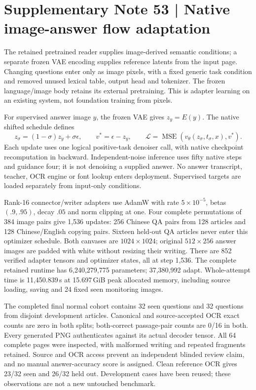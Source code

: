 \clearpage
\section*{Supplementary Note 53 | Native image-answer flow adaptation}
\label{note:native-visual-flow}
The retained pretrained reader supplies image-derived semantic conditions;
a separate frozen VAE encoding supplies reference latents from the input page.
Changing questions enter only as image pixels, with a fixed generic task
condition and removed unused lexical table, output head and tokenizer.
The frozen language/image body retains its external pretraining. This is
adapter learning on an existing system, not foundation training from pixels.

For supervised answer image $y$, the frozen VAE gives $z_y=E(y)$.
The native shifted schedule defines
\[
z_\sigma=(1-\sigma)z_y+\sigma\epsilon,\qquad
v^*=\epsilon-z_y,\qquad
\mathcal L=\operatorname{MSE}(v_\theta(z_\sigma,t_\sigma,x),v^*).
\]
Each update uses one logical positive-task denoiser call, with native
checkpoint recomputation in backward. Independent-noise inference uses
fifty native steps and guidance four; it is not denoising a supplied answer.
No answer transcript, teacher, OCR engine or font lookup enters deployment.
Supervised targets are loaded separately from input-only conditions.

Rank-16 connector/writer adapters use AdamW with rate $5\times10^{-5}$,
betas $(.9,.95)$, decay $.05$ and norm clipping at one. Four complete
permutations of 384 image pairs give 1,536 updates: 256 Chinese QA pairs from 128
articles and 128 Chinese/English copying pairs. Sixteen held-out QA articles
never enter this optimizer schedule. Both canvases are $1024\times1024$; original
$512\times256$ answer images are padded with white without resizing their writing.
There are 852 verified adapter tensors and optimizer states, all at step 1,536.
The complete retained runtime has 6,240,279,775 parameters; 37,380,992 adapt.
Whole-attempt time is 11,450.839\,s at 15.697\,GiB peak allocated memory,
including source loading, saving and 24 fixed seen monitoring images.

The completed final normal cohort contains 32 seen questions and 32 questions
from disjoint development articles. Canonical and source-accepted OCR exact
counts are zero in both splits; both-correct passage-pair counts are 0/16 in
both. Every generated PNG authenticates against its actual decoder tensor.
All 64 complete pages were inspected, with malformed writing and repeated
fragments retained. Source and OCR access prevent an independent blinded
review claim, and no manual answer-accuracy score is assigned. Clean reference
OCR gives 23/32 seen and 26/32 held out. Development cases have been reused;
these observations are not a new untouched benchmark.

